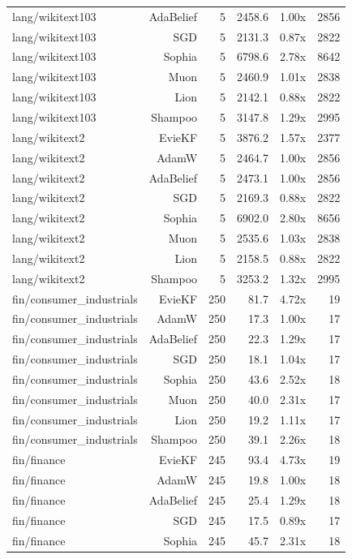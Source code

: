 \begin{table}[t]
\begin{tabular}{lrrrrr}
lang/wikitext103 & AdaBelief & 5 & 2458.6 & 1.00x & 2856 \\
lang/wikitext103 & SGD & 5 & 2131.3 & 0.87x & 2822 \\
lang/wikitext103 & Sophia & 5 & 6798.6 & 2.78x & 8642 \\
lang/wikitext103 & Muon & 5 & 2460.9 & 1.01x & 2838 \\
lang/wikitext103 & Lion & 5 & 2142.1 & 0.88x & 2822 \\
lang/wikitext103 & Shampoo & 5 & 3147.8 & 1.29x & 2995 \\
lang/wikitext2 & EvieKF & 5 & 3876.2 & 1.57x & 2377 \\
lang/wikitext2 & AdamW & 5 & 2464.7 & 1.00x & 2856 \\
lang/wikitext2 & AdaBelief & 5 & 2473.1 & 1.00x & 2856 \\
lang/wikitext2 & SGD & 5 & 2169.3 & 0.88x & 2822 \\
lang/wikitext2 & Sophia & 5 & 6902.0 & 2.80x & 8656 \\
lang/wikitext2 & Muon & 5 & 2535.6 & 1.03x & 2838 \\
lang/wikitext2 & Lion & 5 & 2158.5 & 0.88x & 2822 \\
lang/wikitext2 & Shampoo & 5 & 3253.2 & 1.32x & 2995 \\
fin/consumer\_industrials & EvieKF & 250 & 81.7 & 4.72x & 19 \\
fin/consumer\_industrials & AdamW & 250 & 17.3 & 1.00x & 17 \\
fin/consumer\_industrials & AdaBelief & 250 & 22.3 & 1.29x & 17 \\
fin/consumer\_industrials & SGD & 250 & 18.1 & 1.04x & 17 \\
fin/consumer\_industrials & Sophia & 250 & 43.6 & 2.52x & 18 \\
fin/consumer\_industrials & Muon & 250 & 40.0 & 2.31x & 17 \\
fin/consumer\_industrials & Lion & 250 & 19.2 & 1.11x & 17 \\
fin/consumer\_industrials & Shampoo & 250 & 39.1 & 2.26x & 18 \\
fin/finance & EvieKF & 245 & 93.4 & 4.73x & 19 \\
fin/finance & AdamW & 245 & 19.8 & 1.00x & 18 \\
fin/finance & AdaBelief & 245 & 25.4 & 1.29x & 18 \\
fin/finance & SGD & 245 & 17.5 & 0.89x & 17 \\
fin/finance & Sophia & 245 & 45.7 & 2.31x & 18 \\

\end{tabular}
\end{table}
